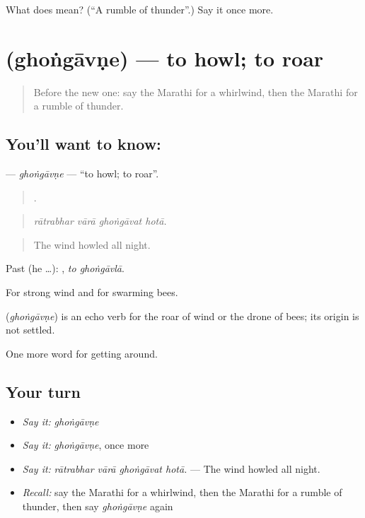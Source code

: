 \begin{tcolorbox}[breakable,colback=teal!4,colframe=teal!35!black,title={Before you move on}]
What does  mean? (\textquotedblleft{}A rumble of thunder\textquotedblright{}.) Say it once more.
\end{tcolorbox}
\section[\texorpdfstring{\mr{घोंगावणे} (ghoṅgāvṇe)}{घोंगावणे (ghoṅgāvṇe)}]{ (ghoṅgāvṇe) — to howl; to roar}

\label{lesson:MR-C439-ghongavne}



\begin{quote}
Before the new one: say the Marathi for a whirlwind, then the Marathi for a rumble of thunder.
\end{quote}

\subsection*{You'll want to know: }
\textbf{} — \emph{ghoṅgāvṇe} — \textquotedblleft{}to howl; to roar\textquotedblright{}.

\begin{quote}
   .
\end{quote}

\begin{quote}
\emph{rātrabhar vārā ghoṅgāvat hotā.}
\end{quote}

\begin{quote}
The wind howled all night.
\end{quote}

Past (he …):  , \emph{to ghoṅgāvlā}.

For strong wind and for swarming bees.

\begin{cousinweb}
\textbf{} (\emph{ghoṅgāvṇe}) is an echo verb for the roar of wind or the drone of bees; its origin is not settled.
\end{cousinweb}

\begin{grammarlens}[title={What you've built}]
One more word for getting around.
\end{grammarlens}

\subsection*{Your turn}
\begin{itemize}
\raggedright
  \item \emph{Say it:} \emph{ghoṅgāvṇe}
  \item \emph{Say it:} \emph{ghoṅgāvṇe}, once more
  \item \emph{Say it:} \emph{rātrabhar vārā ghoṅgāvat hotā.} — The wind howled all night.
  \item \emph{Recall:} say the Marathi for a whirlwind, then the Marathi for a rumble of thunder, then say \emph{ghoṅgāvṇe} again
\end{itemize}

